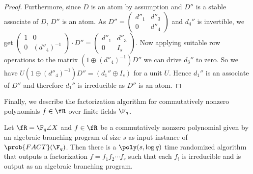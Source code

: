 \begin{proof}
Furthermore, since $D$ is an atom by assumption and $D''$ is a stable
associate of $D$, $D''$ is an atom. As $D'' = \left(
\begin{array}{cc}
d''_1 & d''_3\\
0 & d''_4
\end{array}
\right)$ and $d_4''$ is invertible, we get $\left(
\begin{array}{cc}
1 & 0\\
0 & (d''_4)^{-1}
\end{array}
\right) \cdot D'' = \left(
\begin{array}{cc}
d''_1 & d''_3\\
0 & I_{s}
\end{array}
\right)$. Now applying suitable row operations to the matrix $(1 \oplus (d''_4)^{-1})D''$ we can drive $d_3''$ to zero. So we have $U(1 \oplus (d''_4)^{-1})D''=(d_1'' \oplus I_s)$ for a unit $U$. Hence $d_1''$ is an associate of $D''$ and therefore $d_1''$ is irreducible as $D''$ is an atom. 
  

%
%
%
%
%
%
%
%
%
%
%
%
%
%
%
%
%
%
%
%
%
%
%
%
%
%
%
%
%
%
%
%
%
%

%
%
%
\end{proof}

Finally, we describe the factorization algorithm for commutatively
nonzero polynomials $f\in\fR$ over finite fields $\F_q$.

\begin{theorem}\label{cnzthm}  
  Let $\fR=\F_q\angle{X}$ and $f\in \fR$ be a commutatively nonzero
  polynomial given by an algebraic branching program of size $s$ as
  input instance of $\prob{FACT}(\F_q)$. Then there is a
  $\poly(s, \log q)$ time randomized algorithm that outputs a
  factorization $f=f_1f_2\cdots f_r$ such that each $f_i$ is
  irreducible and is output as an algebraic branching program.
\end{theorem} 

